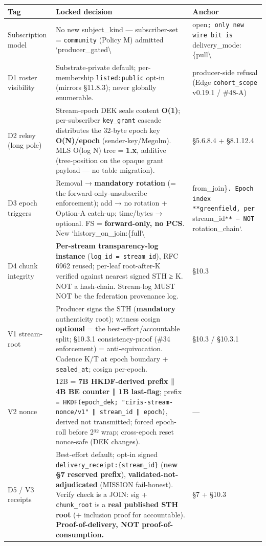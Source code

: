 \documentclass[10pt]{article}
\begin{document}
{\footnotesize
\begin{longtable}{|p{5.33cm}|p{5.33cm}|p{5.33cm}|}\hline
\textbf{Tag} & \textbf{Locked decision} & \textbf{Anchor} \\ \hline\endhead
Subscription model & No new subject\_kind — subscriber-set = \texttt{community} (Policy M) admitted `producer\_gated\textbackslash{} & open\texttt{; only new wire bit is }delivery\_mode:\{pull\textbackslash{} \\ \hline
D1 roster visibility & Substrate-private default; per-membership \texttt{listed:public} opt-in (mirrors §11.8.3); never globally enumerable. & producer-side refusal (Edge \texttt{cohort\_scope} v0.19.1 / \#48-A) \\ \hline
D2 rekey (long pole) & Stream-epoch DEK seals content \textbf{O(1)}; per-subscriber \texttt{key\_grant} cascade distributes the 32-byte epoch key \textbf{O(N)/epoch} (sender-key/Megolm). MLS O(log N) tree = \textbf{1.x}, additive (tree-position on the opaque grant payload — no table migration). & §5.6.8.4 + §8.1.12.4 \\ \hline
D3 epoch triggers & Removal → \textbf{mandatory rotation} (= the forward-only-unsubscribe enforcement); add → no rotation + Option-A catch-up; time/bytes → optional. FS = \textbf{forward-only, no PCS}. New `history\_on\_join:\{full\textbackslash{} & from\_join\}\texttt{. Epoch index **greenfield, per }stream\_id\texttt{** — NOT }rotation\_chain`. \\ \hline
D4 chunk integrity & \textbf{Per-stream transparency-log instance} (\texttt{log\_id = stream\_id}), RFC 6962 reused; per-leaf root-after-K verified against nearest signed STH ≥ K. NOT a hash-chain. Stream-log MUST NOT be the federation provenance log. & §10.3 \\ \hline
V1 stream-root & Producer signs the STH (\textbf{mandatory} authenticity root); witness cosign \textbf{optional} = the best-effort/accountable split; §10.3.1 consistency-proof (\#34 enforcement) = anti-equivocation. Cadence K/T at epoch boundary + \texttt{sealed\_at}; cosign per-epoch. & §10.3 / §10.3.1 \\ \hline
V2 nonce & 12B = \textbf{7B HKDF-derived prefix ‖ 4B BE counter ‖ 1B last-flag}; prefix \texttt{= HKDF(epoch\_dek; "ciris-stream-nonce/v1" ‖ stream\_id ‖ epoch)}, derived not transmitted; forced epoch-roll before 2³² wrap; cross-epoch reset nonce-safe (DEK changes). & — \\ \hline
D5 / V3 receipts & Best-effort default; opt-in signed \texttt{delivery\_receipt:\{stream\_id\}} (\textbf{new §7 reserved prefix}), \textbf{validated-not-adjudicated} (MISSION fail-honest). Verify check is a JOIN: sig + \texttt{chunk\_root} is a \textbf{real published STH root} (+ inclusion proof for accountable). \textbf{Proof-of-delivery, NOT proof-of-consumption.} & §7 + §10.3 \\ \hline

\end{longtable}}
\end{document}
